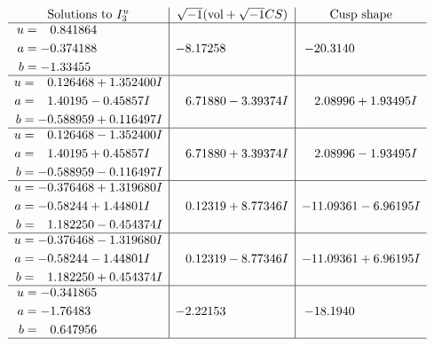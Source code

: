 \documentclass[1p]{elsarticle_modified}
\theoremstyle{definition}
\newcommand{\I}{\sqrt{-1}}
\begin{document}
$$\begin{array}{c|c|c}  
\text{Solutions to }I^u_{3}& \I (\text{vol} + \sqrt{-1}CS) & \text{Cusp shape}\\
 \hline 
\begin{aligned}
u &= \phantom{-}0.841864\phantom{ +0.000000I} \\
a &= -0.374188\phantom{ +0.000000I} \\
b &= -1.33455\phantom{ +0.000000I}\end{aligned}
 & -8.17258\phantom{ +0.000000I} & -20.3140\phantom{ +0.000000I} \\ \hline\begin{aligned}
u &= \phantom{-}0.126468 + 1.352400 I \\
a &= \phantom{-}1.40195 - 0.45857 I \\
b &= -0.588959 + 0.116497 I\end{aligned}
 & \phantom{-}6.71880 - 3.39374 I & \phantom{-}2.08996 + 1.93495 I \\ \hline\begin{aligned}
u &= \phantom{-}0.126468 - 1.352400 I \\
a &= \phantom{-}1.40195 + 0.45857 I \\
b &= -0.588959 - 0.116497 I\end{aligned}
 & \phantom{-}6.71880 + 3.39374 I & \phantom{-}2.08996 - 1.93495 I \\ \hline\begin{aligned}
u &= -0.376468 + 1.319680 I \\
a &= -0.58244 + 1.44801 I \\
b &= \phantom{-}1.182250 - 0.454374 I\end{aligned}
 & \phantom{-}0.12319 + 8.77346 I & -11.09361 - 6.96195 I \\ \hline\begin{aligned}
u &= -0.376468 - 1.319680 I \\
a &= -0.58244 - 1.44801 I \\
b &= \phantom{-}1.182250 + 0.454374 I\end{aligned}
 & \phantom{-}0.12319 - 8.77346 I & -11.09361 + 6.96195 I \\ \hline\begin{aligned}
u &= -0.341865\phantom{ +0.000000I} \\
a &= -1.76483\phantom{ +0.000000I} \\
b &= \phantom{-}0.647956\phantom{ +0.000000I}\end{aligned}
 & -2.22153\phantom{ +0.000000I} & -18.1940\phantom{ +0.000000I}\\
 \hline 
 \end{array}$$\newpage\newpage\renewcommand{\arraystretch}{1}
\end{document}
